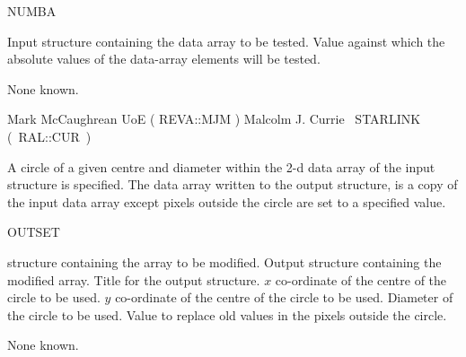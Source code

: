 {\begin{manroutinedescription}
  NUMBA

\begin{manparametertable}
  Input {} structure containing the data array to be tested.
  Value against which the absolute values of the data-array
  elements will be tested.
\end{manparametertable}
  None known.

  Mark McCaughrean UoE ( {\mantt REVA}::{\mantt MJM} )
  Malcolm J. Currie ~STARLINK \mbox{( {\mantt RAL}::{\mantt CUR} )}
\end{manroutinedescription}

\begin{manroutinedescription}
  A circle of a given centre and diameter within the 2-d data array
  of the input {} structure is specified.  The data array
  written to the output {} structure, is a copy of the input
  data array except pixels outside the circle are set to a specified value.

  OUTSET

\begin{manparametertable}
  {} structure containing the array to be modified.
  Output {} structure containing the modified array.
  Title for the output {} structure.
  \mbox{{}}
  {$x$} co-ordinate of the centre of the circle to be used.
  {$y$} co-ordinate of the centre of the circle to be used.
  Diameter of the circle to be used.
  Value to replace old values in the pixels outside the circle.
\end{manparametertable}
  None known.


\end{manroutinedescription}}
